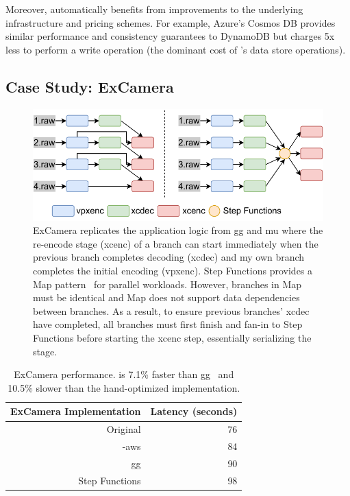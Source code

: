 Moreover, \name{} automatically benefits from improvements to the underlying
infrastructure and pricing schemes. For example, Azure's Cosmos DB provides
similar performance and consistency guarantees to DynamoDB but charges 5x less
to perform a write operation (the dominant cost of \name{}'s data store
operations).

\subsection{Case Study: ExCamera}\label{sec:eval:excamera}

\begin{figure}[t!]
    \centering
    \includegraphics[width=\columnwidth]{figures/ExCameraPattern.pdf}
    \caption{\name{} ExCamera replicates the application logic from gg and mu
     where the re-encode stage (xcenc) of a branch can start immediately when
     the previous branch completes decoding (xcdec) and my own branch
     completes the initial encoding (vpxenc). Step Functions provides a Map
     pattern~\cite{aws-step-functions-map-state} for parallel workloads.
     However, branches in Map must be identical and Map does not support data
     dependencies between branches. As a result, to ensure previous branches'
     xcdec have completed, all branches must first finish and fan-in to Step
     Functions before starting the xcenc step, essentially serializing the
     stage.}
    \label{fig:excamera-pattern}
\end{figure}

\begin{table}
  \centering
  \begin{tabular}{|r|r|}
    \hline
    \textbf{ExCamera Implementation} & \textbf{Latency (seconds)} \\ \hline
    Original        & 76                         \\ \hline
    \name{}-aws & 84                         \\ \hline
    gg                       & 90                         \\ \hline
    Step Functions & 98                         \\ \hline
  \end{tabular}
  \caption{ExCamera performance. \name{} is 7.1\% faster than
gg~\cite{gg-atc} and 10.5\% slower than the hand-optimized implementation.}
  \label{table:excamera}
\end{table}

